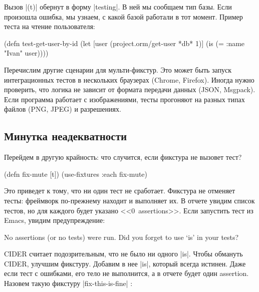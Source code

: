 Вызов \spverb|(t)| обернут в форму \spverb|testing|. В ней мы сообщаем тип
базы. Если произошла ошибка, мы узнаем, с какой базой работали в тот
момент. Пример теста на чтение пользователя:

\begin{english}
  \begin{clojure}
(defn test-get-user-by-id
  (let [user (project.orm/get-user *db* 1)]
    (is (= {:name "Ivan"} user))))
  \end{clojure}
\end{english}

Перечислим другие сценарии для мульти-фикстур. Это может быть запуск
интеграционных тестов в нескольких браузерах (Chrome, Firefox). Иногда нужно
проверить, что логика не зависит от формата передачи данных (JSON,
Msgpack). Если программа работает с изображениями, тесты прогоняют на разных
типах файлов (PNG, JPEG) и разрешениях.

\subsection{Минутка неадекватности}

Перейдем в другую крайность: что случится, если фикстура не вызовет тест?

\begin{english}
  \begin{clojure}
(defn fix-mute [t])
(use-fixtures :each fix-mute)
  \end{clojure}
\end{english}

Это приведет к тому, что ни один тест не сработает. Фикстура не отменяет тесты:
фреймворк по-прежнему находит и выполняет их. В отчете увидим список тестов, но
для каждого будет указано <<0~assertions>>. Если запустить тест из Emacs, увидим
предупреждение:

\begin{english}
  \begin{clojure}
No assertions (or no tests) were run.
Did you forget to use ‘is’ in your tests?
  \end{clojure}
\end{english}

CIDER считает подозрительным, что не было ни одного \spverb|is|. Чтобы обмануть
CIDER, улучшим фикстуру. Добавим в нее \spverb|is|, который всегда истинен. Даже
если тест с ошибками, его тело не выполнится, а в отчете будет один
assertion. Назовем такую фикстуру \spverb|fix-this-is-fine|%
:

